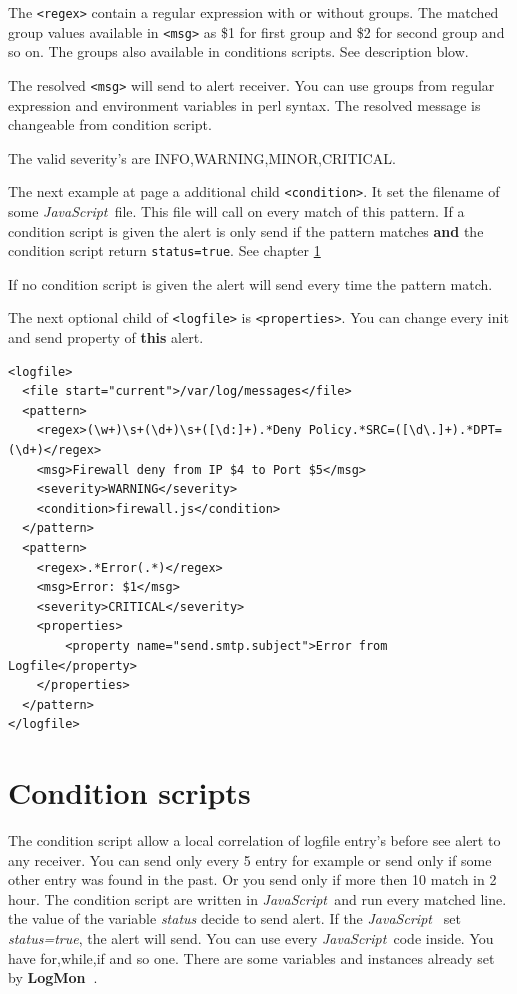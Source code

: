 \documentclass[11pt,a4paper]{article}
\newcommand{\logmon}{\textbf{LogMon\ }}
\newcommand{\js}{\textit{JavaScript\ }}
\begin{document}
The \verb#<regex># contain a regular expression with or without groups. The
matched group values available in \verb#<msg># as \$1 for first group and \$2
for second group and so on. The groups also available in conditions scripts. See
description blow.

The resolved \verb#<msg># will send to alert receiver. You can use groups from
regular expression and environment variables in perl syntax. The resolved message
is changeable from condition script.

The valid severity's are INFO,WARNING,MINOR,CRITICAL.

The next example at page \pageref{ex:logfile2} a additional child
\verb#<condition>#. It set the filename of some \js file. This file will
call on every match of this pattern. If a condition script is given the alert
is only send if the pattern matches \textbf{and} the condition script return
\verb#status=true#. See chapter \ref{sec:conditions}

If no condition script is given the alert will send every time the pattern
match.

The next optional child of \verb#<logfile># is \verb#<properties>#. You can
change every init and send property of \textbf{this} alert.

\begin{samepage}
\label{ex:logfile2}

\begin{verbatim}
<logfile>
  <file start="current">/var/log/messages</file>
  <pattern>
    <regex>(\w+)\s+(\d+)\s+([\d:]+).*Deny Policy.*SRC=([\d\.]+).*DPT=(\d+)</regex>
    <msg>Firewall deny from IP $4 to Port $5</msg>
    <severity>WARNING</severity>
    <condition>firewall.js</condition>
  </pattern>
  <pattern>
    <regex>.*Error(.*)</regex>
    <msg>Error: $1</msg>
    <severity>CRITICAL</severity>
    <properties>
        <property name="send.smtp.subject">Error from Logfile</property>
    </properties>
  </pattern>
</logfile>
\end{verbatim}
\end{samepage}

\section{Condition scripts}
\label{sec:conditions}

The condition script allow a local correlation of logfile entry's before
see alert to any receiver. You can send only every 5 entry for example or send only
if some other entry was found in the past. Or you send only if more then 10 match
in 2 hour. The condition script are written in \js and run every matched line.
the value of the variable \textit{status} decide to send alert. If the \js
set \textit{status=true}, the alert will send. You can use every \js code
inside. You have for,while,if and so one. There are some variables and instances
already set by \logmon.
\end{document}
